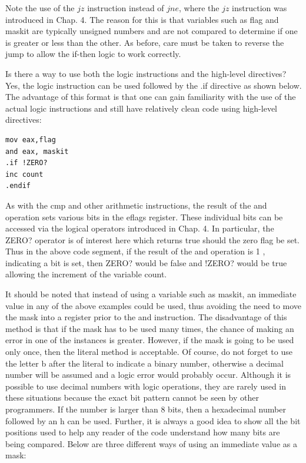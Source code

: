 \documentclass[10pt]{article}
\begin{document}
Note the use of the $j z$ instruction instead of $j n e$, where the $j z$ instruction was introduced in Chap. 4. The reason for this is that variables such as flag and maskit are typically unsigned numbers and are not compared to determine if one is greater or less than the other. As before, care must be taken to reverse the jump to allow the if-then logic to work correctly.

Is there a way to use both the logic instructions and the high-level directives? Yes, the logic instruction can be used followed by the .if directive as shown below. The advantage of this format is that one can gain familiarity with the use of the actual logic instructions and still have relatively clean code using high-level directives:

\begin{verbatim}
mov eax,flag
and eax, maskit
.if !ZERO?
inc count
.endif
\end{verbatim}

As with the cmp and other arithmetic instructions, the result of the and operation sets various bits in the eflags register. These individual bits can be accessed via the logical operators introduced in Chap. 4. In particular, the ZERO? operator is of interest here which returns true should the zero flag be set. Thus in the above code segment, if the result of the and operation is 1 , indicating a bit is set, then ZERO? would be false and !ZERO? would be true allowing the increment of the variable count.

It should be noted that instead of using a variable such as maskit, an immediate value in any of the above examples could be used, thus avoiding the need to move the mask into a register prior to the and instruction. The disadvantage of this method is that if the mask has to be used many times, the chance of making an error in one of the instances is greater. However, if the mask is going to be used only once, then the literal method is acceptable. Of course, do not forget to use the letter b after the literal to indicate a binary number, otherwise a decimal number will be assumed and a logic error would probably occur. Although it is possible to use decimal numbers with logic operations, they are rarely used in these situations because the exact bit pattern cannot be seen by other programmers. If the number is larger than 8 bits, then a hexadecimal number followed by an h can be used. Further, it is always a good idea to show all the bit positions used to help any reader of the code understand how many bits are being compared. Below are three different ways of using an immediate value as a mask:
\end{document}
